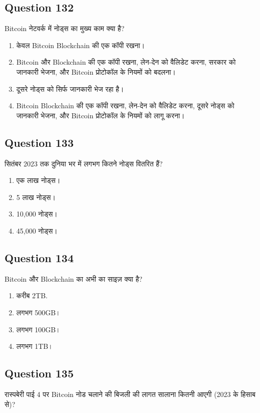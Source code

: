 \documentclass[12pt,a4paper]{article}
\begin{document}
\bigskip


\subsection*{Question 132}
Bitcoin नेटवर्क में नोड्स का मुख्य काम क्या है?

\begin{enumerate}[label=\Alph*., leftmargin=*]
\item केवल Bitcoin Blockchain की एक कॉपी रखना।
\item Bitcoin और Blockchain की एक कॉपी रखना, लेन-देन को वैलिडेट करना, सरकार को जानकारी भेजना, और Bitcoin प्रोटोकॉल के नियमों को बदलना।
\item दूसरे नोड्स को सिर्फ जानकारी भेज रहा है।
\item Bitcoin Blockchain की एक कॉपी रखना, लेन-देन को वैलिडेट करना, दूसरे नोड्स को जानकारी भेजना, और Bitcoin प्रोटोकॉल के नियमों को लागू करना।
\end{enumerate}

\bigskip


\subsection*{Question 133}
सितंबर 2023 तक दुनिया भर में लगभग कितने नोड्स वितरित हैं?

\begin{enumerate}[label=\Alph*., leftmargin=*]
\item एक लाख नोड्स।
\item 5 लाख नोड्स।
\item 10,000 नोड्स।
\item 45,000 नोड्स।
\end{enumerate}

\bigskip


\subsection*{Question 134}
Bitcoin और Blockchain का अभी का साइज़ क्या है?

\begin{enumerate}[label=\Alph*., leftmargin=*]
\item करीब 2TB.
\item लगभग 500GB।
\item लगभग 100GB।
\item लगभग 1TB।
\end{enumerate}

\bigskip


\subsection*{Question 135}
रास्पबेरी पाई 4 पर Bitcoin नोड चलाने की बिजली की लागत सालाना कितनी आएगी (2023 के हिसाब से)?
\end{document}
